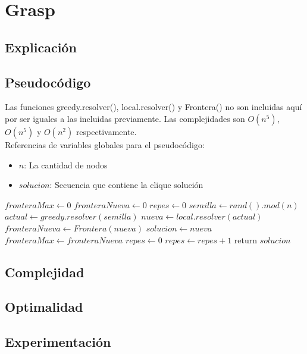 \section{Grasp}

\subsection{Explicación}


\subsection{Pseudocódigo}

Las funciones greedy.resolver(), local.resolver() y Frontera() no son incluidas aquí por ser iguales a las incluidas previamente. Las complejidades son $O(n^5)$, $O(n^5)$ y $O(n^2)$ respectivamente. \\

Referencias de variables globales para el pseudocódigo:
\begin{itemize}
    \item $n$: La cantidad de nodos
    \item $solucion$: Secuencia que contiene la clique solución
\end{itemize}

\begin{algorithm}[H]
\begin{algorithmic}
	\State $fronteraMax \gets 0$
	\State $fronteraNueva \gets 0$
	\State $repes \gets 0$
        \State $semilla \gets rand().mod(n)$
        \State $actual \gets greedy.resolver(semilla)$
    	\State $nueva \gets local.resolver(actual)$
    	\State $fronteraNueva \gets Frontera(nueva)$
    		\State $solucion \gets nueva$
    		\State $fronteraMax \gets fronteraNueva$
            \State $repes \gets 0$
    	\Else 
    		\State $repes \gets repes + 1$
    	\EndIf
    \EndWhile
    \State return $solucion$

\EndFunction
\end{algorithmic}
\end{algorithm}


\subsection{Complejidad}


\subsection{Optimalidad}


\subsection{Experimentación}


